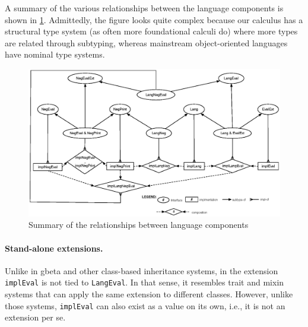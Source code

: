 A summary of the various relationships between the language components is shown
in \cref{fig:diagram}. Admittedly, the figure looks quite complex because our
calculus has a structural type system (as often more foundational calculi
do) where more types are related through subtyping, whereas mainstream object-oriented
languages have nominal type systems.



\begin{figure}[t]
  \centering
\includegraphics[scale=0.75]{figures/diagram.eps}
\caption{Summary of the relationships between language components}
\label{fig:diagram}
\end{figure}


\paragraph{Stand-alone extensions.}
Unlike in \textsf{gbeta} and other class-based inheritance systems, in \namee
the extension \lstinline{implEval} is not tied to \lstinline{LangEval}. In that
sense, it resembles trait and mixin systems that can apply the same extension
to different classes. However, unlike those systems, \lstinline{implEval} can also
exist as a value on its own, i.e., it is not an extension per se.



